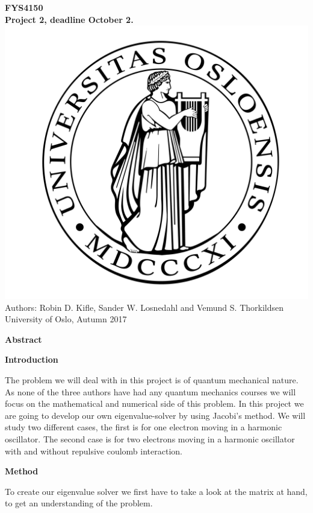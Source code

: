 \documentclass[10pt,a4paper]{article}
\begin{document}
\begin{center}
{\LARGE\bf
FYS4150\\
Project 2, deadline October 2.
}
 \includegraphics[scale=0.1]{uio.png}\\
Authors: Robin D. Kifle, Sander W. Losnedahl and Vemund S. Thorkildsen\\
University of Oslo, Autumn 2017

{\LARGE\bf Abstract}
\end{center}
\newpage

\begin{center}
{\LARGE\bf Introduction}
\end{center}
The problem we will deal with in this project is of quantum mechanical nature. As none of the three authors have had any quantum mechanics courses we will focus on the mathematical and numerical side of this problem. In this project we are going to develop our own eigenvalue-solver by using Jacobi's method. We will study two different cases, the first is for one electron moving in a harmonic oscillator. The second case is for two electrons moving in a harmonic oscillator with and without repulsive coulomb interaction.
\newpage

\begin{center}
{\LARGE\bf Method}
\end{center}
To create our eigenvalue solver we first have to take a look at the matrix at hand, to get an understanding of the problem.
\end{document}
